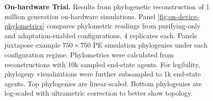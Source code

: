 \begin{figure}
\caption{%
\textbf{On-hardware Trial.}
\footnotesize
Results from phylogenetic reconstruction of 1 million generation on-hardware simulations.
Panel \ref{fig:on-device-phylometrics} compares phylometric readings from purifying-only and adaptation-enabled configurations, 4 replicates each.
Panels  juxtapose example $750\times750$ PE simulation phylogenies under each configuration regime.
Phylometrics were calculated from reconstructions with 10k sampled end-state agents.
For legibility, phylogeny visualizations were further subsampled to 1k end-state agents.
Top phylogenies are linear-scaled.
Bottom phylogenies are log-scaled with ultrametric correction to better show topology.
}
\label{fig:on-device}
\vspace{-0.2in}
\end{figure}
